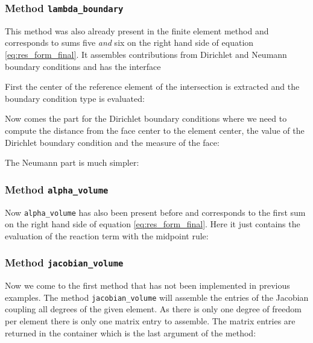 \documentclass[a4paper,12pt]{article}
\begin{document}
\subsubsection*{Method \lstinline{lambda_boundary}}

This method was also already present in the finite element method
and corresponds
to sums five \textit{and} six on the right hand side of equation \eqref{eq:res_form_final}.
It assembles contributions from Dirichlet and Neumann
boundary conditions and has the interface


First  the center of the reference element of the intersection
is extracted and the boundary condition type is evaluated:


Now comes the part for the Dirichlet boundary conditions where we
need to compute the distance from the face center to the element center,
the value of the Dirichlet boundary condition and the measure of the face:

The Neumann part is much simpler:


\subsubsection*{Method \lstinline{alpha_volume}}

Now \lstinline{alpha_volume} has also been present before and corresponds
to the first sum on the right hand side of equation \eqref{eq:res_form_final}.
Here it just contains the evaluation of the reaction term
with the midpoint rule:


\subsubsection*{Method \lstinline{jacobian_volume}}

Now we come to the first method that has not been implemented in
previous examples. The method \lstinline{jacobian_volume}
will assemble the entries of the Jacobian coupling all degrees of
the given element. As there is only one degree of freedom per element there
is only one matrix entry to assemble. The matrix entries are returned
in the container which is the last argument of the method:

\end{document}
